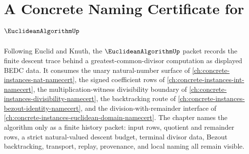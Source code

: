 \chapter{A Concrete Naming Certificate for $\EuclideanAlgorithmUp$}
\label{ch:concrete-instances-euclidean-algorithm-namecert}

Following Euclid and Knuth, the $\EuclideanAlgorithmUp$ packet records the finite descent trace behind a greatest-common-divisor computation as displayed BEDC data. It consumes the unary natural-number surface of \autoref{ch:concrete-instances-nat-namecert}, the signed coefficient rows of \autoref{ch:concrete-instances-int-namecert}, the multiplication-witness divisibility boundary of \autoref{ch:concrete-instances-divisibility-namecert}, the backtracking route of \autoref{ch:concrete-instances-bezout-identity-namecert}, and the division-with-remainder interface of \autoref{ch:concrete-instances-euclidean-domain-namecert}. The chapter names the algorithm only as a finite history packet: input rows, quotient and remainder rows, a strict natural-valued descent budget, terminal divisor data, Bezout backtracking, transport, replay, provenance, and local naming all remain visible.

